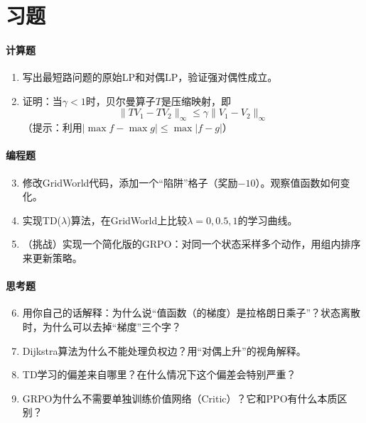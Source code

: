 \section{习题}

\paragraph{计算题}
\begin{enumerate}
    \item 写出最短路问题的原始LP和对偶LP，验证强对偶性成立。
    
    \item 证明：当$\gamma < 1$时，贝尔曼算子$T$是压缩映射，即
    \[
        \|TV_1 - TV_2\|_\infty \leq \gamma \|V_1 - V_2\|_\infty
    \]
    （提示：利用$|\max f - \max g| \leq \max |f - g|$）
\end{enumerate}

\paragraph{编程题}
\begin{enumerate}
    \setcounter{enumi}{2}
    \item 修改GridWorld代码，添加一个“陷阱”格子（奖励$-10$）。观察值函数如何变化。
    
    \item 实现TD($\lambda$)算法，在GridWorld上比较$\lambda = 0, 0.5, 1$的学习曲线。
    
    \item （挑战）实现一个简化版的GRPO：对同一个状态采样多个动作，用组内排序来更新策略。
\end{enumerate}

\paragraph{思考题}
\begin{enumerate}
    \setcounter{enumi}{5}
    \item 用你自己的话解释：为什么说“值函数（的梯度）是拉格朗日乘子”？状态离散时，为什么可以去掉“梯度”三个字？
    
    \item Dijkstra算法为什么不能处理负权边？用“对偶上升”的视角解释。
    
    \item TD学习的偏差来自哪里？在什么情况下这个偏差会特别严重？
    
    \item GRPO为什么不需要单独训练价值网络（Critic）？它和PPO有什么本质区别？
\end{enumerate}


